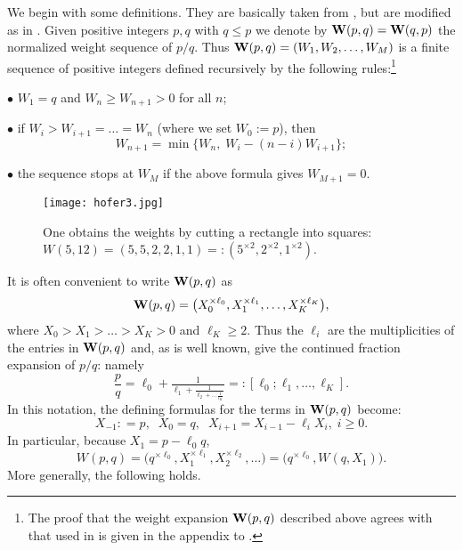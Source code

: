\documentclass[11pt]{amsart}
\newcommand{\labell}[1] {\label{#1}}
\newcommand{\1}{{{\mathchoice {\rm 1\mskip-4mu l} {\rm 1\mskip-4mu l}
{\rm 1\mskip-4.5mu l} {\rm 1\mskip-5mu l}}}}
\newcommand{\bW} {{\bf W}}
\newcommand{\SSS}{{\smallskip}}
\numberwithin{figure}{section}
\numberwithin{equation}{section}
\newcommand{\MS}{{\medskip}}
\newcommand{\NI}{{\noindent}}
\begin{document}
 
We begin with some definitions.  They are basically taken from \cite{M}, 
but are modified as in \cite{MS}. 
Given positive  integers $p,q$ with $q\le p$ we denote by $\bW(p,q) = \bW(q,p)$
the normalized weight sequence of $p/q$.   
Thus $\bW(p,q) = 
 (W_1,W_2,\dots,W_M)$  is a finite sequence of positive integers  defined recursively by the following rules:\footnote
 {
The proof that the weight expansion $\bW(p,q)$ described above agrees with that used in \cite{M} is given in the appendix to \cite{MS}. }
\MS

$\bullet$   
$W_1 = q$ and $ W_n \ge W_{n+1}>0$ for all $n$;

\SSS 
$\bullet$  
if $ W_i>W_{i+1} = \dots = W_{n}$ (where we set $W_0 := p$), then
$$
W_{n+1} = \min \bigl\{W_n, \; W_i - (n-i) W_{i+1} \bigr\};
$$

$\bullet$ 
the sequence stops at $W_M$ if the above formula gives $W_{M+1}=0$.\MS

\begin{figure}[htbp] %
   \centering
   \texttt{[image: hofer3.jpg]} 
   \caption{One obtains the weights by cutting  a rectangle into squares:
   $W(5,12) = (5,5,2,2,1,1)=:(5^{\times 2},2^{\times 2},1^{\times 2})$.}
   \label{fig:3}
\end{figure}
\NI

It is often convenient to write $\bW(p,q)$ as 
%
\begin{equation}\labell{eq:W}
\bW(p,q)= \bigl(X_0^{\times\ell_0}, X_1^{\times \ell_1},\dots, X_K^{\times \ell_K}\bigr),
\end{equation}
%
where $X_0> X_1>\dots >X_K>0$ and $\ell_K\ge 2$.  Thus the $\ell_i$ are the multiplicities of
the entries in $\bW(p,q)$ and, as is well known, give the continued fraction expansion of $
p/q$: namely
\begin{equation}\labell{eq:ell}
\frac pq = \ell_0 + \tfrac 1{\ell_1 + \tfrac 1{\ell_2 + \dots \tfrac 1{\ell_K}}} =: [\ell_0;\ell_1,\dots,\ell_K].
\end{equation}
In this notation, the defining formulas for the terms in $\bW(p,q)$ become:
$$
X_{-1}: = p, \;\;X_0 = q, \;\;
X_{i+1} = X_{i-1}-\ell_i X_i,\; i\ge 0.
$$
In particular, because $X_1 = p-\ell_0q$,
\begin{equation}\labell{eq:Wpq}
W(p,q) = \bigl(q^{\times\ell_0}, X_1^{\times \ell_1}, X_2^{\times \ell_2},\dots\bigr) = 
 \bigl(q^{\times\ell_0}, W(q,X_1)\bigr).
\end{equation}
 More generally,  the following holds.
 
\end{document}
